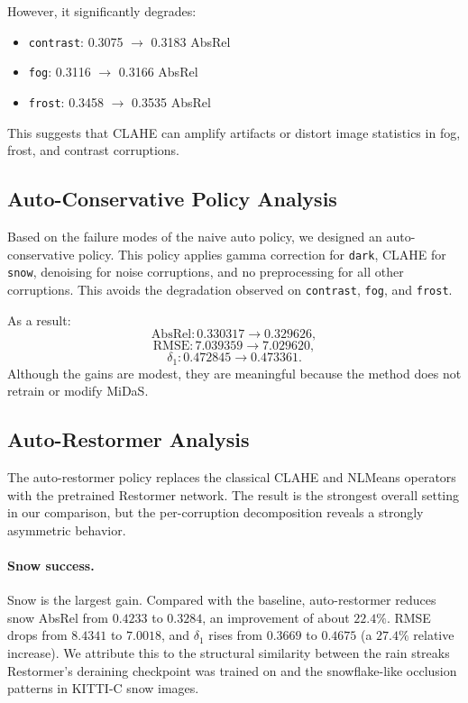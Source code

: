 \documentclass[10pt]{article}
\begin{document}
However, it significantly degrades:
\begin{itemize}[leftmargin=*]
    \item \texttt{contrast}: 0.3075 $\rightarrow$ 0.3183 AbsRel
    \item \texttt{fog}: 0.3116 $\rightarrow$ 0.3166 AbsRel
    \item \texttt{frost}: 0.3458 $\rightarrow$ 0.3535 AbsRel
\end{itemize}

This suggests that CLAHE can amplify artifacts or distort image statistics in fog, frost, and contrast corruptions.

\subsection{Auto-Conservative Policy Analysis}

Based on the failure modes of the naive auto policy, we designed an auto-conservative policy. This policy applies gamma correction for \texttt{dark}, CLAHE for \texttt{snow}, denoising for noise corruptions, and no preprocessing for all other corruptions. This avoids the degradation observed on \texttt{contrast}, \texttt{fog}, and \texttt{frost}.

As a result:
\[
\mathrm{AbsRel}: 0.330317 \rightarrow 0.329626,
\]
\[
\mathrm{RMSE}: 7.039359 \rightarrow 7.029620,
\]
\[
\delta_1: 0.472845 \rightarrow 0.473361.
\]
Although the gains are modest, they are meaningful because the method does not retrain or modify MiDaS.

\subsection{Auto-Restormer Analysis}

The auto-restormer policy replaces the classical CLAHE and NLMeans operators with the pretrained Restormer network. The result is the strongest overall setting in our comparison, but the per-corruption decomposition reveals a strongly asymmetric behavior.

\paragraph{Snow success.} Snow is the largest gain. Compared with the baseline, auto-restormer reduces snow AbsRel from $0.4233$ to $0.3284$, an improvement of about $22.4\%$. RMSE drops from $8.4341$ to $7.0018$, and $\delta_1$ rises from $0.3669$ to $0.4675$ (a $27.4\%$ relative increase). We attribute this to the structural similarity between the rain streaks Restormer's deraining checkpoint was trained on and the snowflake-like occlusion patterns in KITTI-C snow images.
\end{document}
